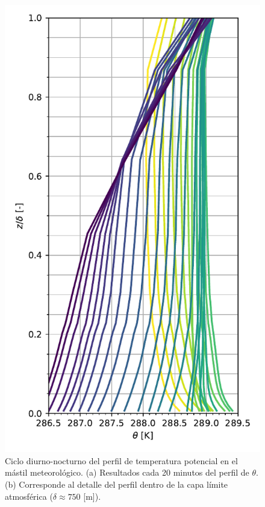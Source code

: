 \begin{figure}[H]
	\begin{minipage}{0.5\linewidth}
		\centering
		\includegraphics[width=0.9\linewidth,trim={0cm 5mm 0cm 0cm},clip]{Imagenes/06/hov/temp_profile}%
	\end{minipage}%
	
	\caption{Ciclo diurno-nocturno del perfil de temperatura potencial en el mástil meteorológico. (a) Resultados cada 20 minutos del perfil de $\theta$. (b) Corresponde al detalle del perfil dentro de la capa límite atmosférica ($\delta \approx 750$ [m]).}
	\label{fig:06_hov_pbl}
\end{figure}


